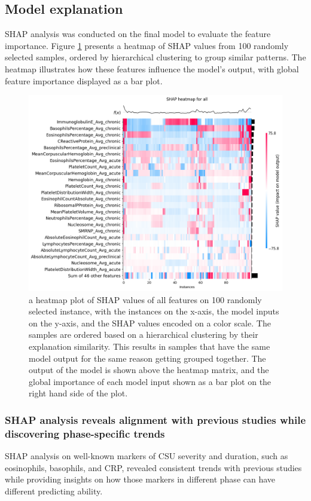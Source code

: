 \documentclass[final,3p,times,authoryear]{elsarticle}
\begin{document}
\subsection{Model explanation}\label{ModelExplanationResults}
SHAP analysis was conducted on the final model to evaluate the feature importance. Figure \ref{heatmap_all_orderx} presents a heatmap of SHAP values from 100 randomly selected samples, ordered by hierarchical clustering to group similar patterns. The heatmap illustrates how these features influence the model’s output, with global feature importance displayed as a bar plot.

\begin{figure}[t] 
    \centering
    \includegraphics[width=0.8\linewidth]{figures/heatmap_all_orderx.png}
    \caption{a heatmap plot of SHAP values of all features on 100 randomly selected instance, with the instances on the x-axis, the model inputs on the y-axis, and the SHAP values encoded on a color scale. The samples are ordered based on a hierarchical clustering by their explanation similarity. This results in samples that have the same model output for the same reason getting grouped together. The output of the model is shown above the heatmap matrix, and the global importance of each model input shown as a bar plot on the right hand side of the plot.}\label{heatmap_all_orderx}
\end{figure}


\subsubsection{SHAP analysis reveals alignment with previous studies while discovering phase-specific trends}

SHAP analysis on well-known markers of CSU severity and duration, such as eosinophils, basophils, and CRP, revealed consistent trends with previous studies while providing insights on how those markers in different phase can have different predicting ability. 
\end{document}
